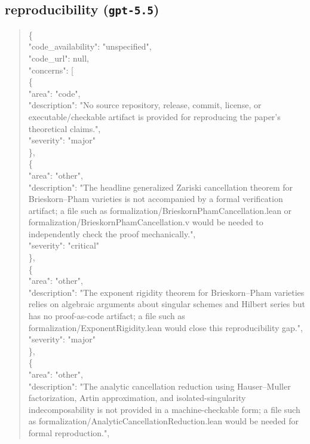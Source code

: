 \documentclass[11pt]{article}
\begin{document}
\subsection*{reproducibility (\texttt{gpt-5.5})}
\begin{quote}\small\ttfamily\raggedright
\{\\
  "code\_availability": "unspecified",\\
  "code\_url": null,\\
  "concerns": [\\
    \{\\
      "area": "code",\\
      "description": "No source repository, release, commit, license, or executable/checkable artifact is provided for reproducing the paper's theoretical claims.",\\
      "severity": "major"\\
    \},\\
    \{\\
      "area": "other",\\
      "description": "The headline generalized Zariski cancellation theorem for Brieskorn--Pham varieties is not accompanied by a formal verification artifact; a file such as formalization/BrieskornPhamCancellation.lean or formalization/BrieskornPhamCancellation.v would be needed to independently check the proof mechanically.",\\
      "severity": "critical"\\
    \},\\
    \{\\
      "area": "other",\\
      "description": "The exponent rigidity theorem for Brieskorn--Pham varieties relies on algebraic arguments about singular schemes and Hilbert series but has no proof-as-code artifact; a file such as formalization/ExponentRigidity.lean would close this reproducibility gap.",\\
      "severity": "major"\\
    \},\\
    \{\\
      "area": "other",\\
      "description": "The analytic cancellation reduction using Hauser--Muller factorization, Artin approximation, and isolated-singularity indecomposability is not provided in a machine-checkable form; a file such as formalization/AnalyticCancellationReduction.lean would be needed for formal reproduction.",\\

\end{quote}
\end{document}
